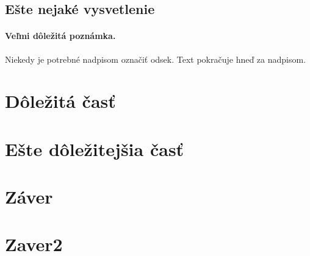 \documentclass[10pt,twoside,slovak,a4paper]{coursepaper}
\begin{document}
\subsection{Ešte nejaké vysvetlenie} \label{ina:este}

\paragraph{Veľmi dôležitá poznámka.}
Niekedy je potrebné nadpisom označiť odsek. Text pokračuje hneď za nadpisom.



\section{Dôležitá časť} \label{dolezita}




\section{Ešte dôležitejšia časť} \label{dolezitejsia}




\section{Záver} \label{zaver} %



\section{Zaver2} \label{zaver 2}







\end{document}
